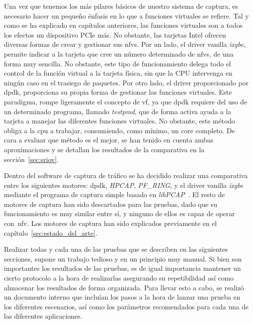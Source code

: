 Una vez que tenemos los más pilares básicos de nuestro sistema de captura, es necesario hacer un pequeño énfasis en lo que a funciones virtuales se refiere. Tal y como se ha explicado en capítulos anteriores, las funciones virtuales son a todos los efectos un dispositivo PCIe más. No obstante, las tarjetas Intel ofrecen diversas formas de crear y gestionar sus \glspl{nfv}. Por un lado, el driver \gls{vanilla} \textit{ixgbe}, permite indicar a la tarjeta que cree un número determinado de \glspl{nfv}, de una forma muy sencilla. No obstante, este tipo de funcionamiento delega todo el control de la función virtual a la tarjeta física, sin que la CPU intervenga en ningún caso en el trasiego de paquetes.
%
Por otro lado, el driver proporcionado por \gls{dpdk}, proporciona su propia forma de gestionar las funciones virtuales. Este paradigma, rompe ligeramente el concepto de \gls{vf}, ya que \gls{dpdk} requiere del uso de un determinado programa, llamado \textit{testpmd}, que de forma activa ayuda a la tarjeta a manejar las diferentes funciones virtuales. No obstante, este método obliga a la \gls{cpu} a trabajar, consumiendo, como mínimo, un \gls{core} completo. De cara a evaluar que método es el mejor, se han tenido en cuenta ambas aproximaciones y se detallan los resultados de la comparativa en la sección~\ref{sec:sriov}.

Dentro del software de captura de tráfico se ha decidido realizar una comparativa entre los siguientes motores: \gls{dpdk}, \textit{HPCAP}, \textit{PF\_RING}, y el driver \gls{vanilla} \textit{ixgbe} mediante el programa de captura simple basado en \textit{libPCAP}~\cite{bib:tcpdump}.%
El resto de motores de captura han sido descartados para las pruebas, dado que su funcionamiento es muy similar entre sí, y ninguno de ellos es capaz de operar con~\gls{nfv}. Los motores de captura han sido explicados previamente en el capítulo~\ref{sec:estado_del_arte}.


Realizar todas y cada una de las pruebas que se describen en las siguientes secciones, supone un trabajo tedioso y en un principio muy manual. Si bien son importantes los resultados de las pruebas, es de igual importancia mantener un cierto protocolo a la hora de realizarlas asegurando su repetibilidad así como almacenar los resultados de forma organizada. 
Para llevar esto a cabo, se realizó un documento interno que incluían los pasos a la hora de lanzar una prueba en los diferentes escenarios, así como los parámetros recomendados para cada una de las diferentes aplicaciones.

